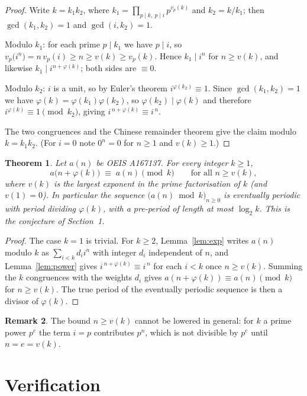 \documentclass[11pt,a4paper]{article}
\theoremstyle{plain}
\newtheorem{theorem}{Theorem}
\theoremstyle{definition}
\newtheorem{remark}[theorem]{Remark}
\begin{document}
\begin{proof}
Write $k=k_1k_2$, where $k_1=\prod_{p\mid k,\ p\mid i}p^{v_p(k)}$ and $k_2=k/k_1$; then
$\gcd(k_1,k_2)=1$ and $\gcd(i,k_2)=1$.

Modulo $k_1$: for each prime $p\mid k_1$ we have $p\mid i$, so
$v_p\bigl(i^{n}\bigr)=n\,v_p(i)\ge n\ge v(k)\ge v_p(k)$. Hence $k_1\mid i^{n}$ for
$n\ge v(k)$, and likewise $k_1\mid i^{n+\varphi(k)}$; both sides are $\equiv 0$.

Modulo $k_2$: $i$ is a unit, so by Euler's theorem $i^{\varphi(k_2)}\equiv 1$. Since
$\gcd(k_1,k_2)=1$ we have $\varphi(k)=\varphi(k_1)\varphi(k_2)$, so
$\varphi(k_2)\mid\varphi(k)$ and therefore $i^{\varphi(k)}\equiv 1 \pmod{k_2}$, giving
$i^{\,n+\varphi(k)}\equiv i^{\,n}$.

The two congruences and the Chinese remainder theorem give the claim modulo $k=k_1k_2$.
(For $i=0$ note $0^{n}=0$ for $n\ge 1$ and $v(k)\ge1$.)
\end{proof}

\begin{theorem}\label{thm:main}
Let $a(n)$ be OEIS A167137. For every integer $k\ge1$,
\[
a\bigl(n+\varphi(k)\bigr)\;\equiv\;a(n)\pmod{k}\qquad\text{for all } n\ge v(k),
\]
where $v(k)$ is the largest exponent in the prime factorisation of $k$ (and $v(1)=0$).
In particular the sequence $\bigl(a(n)\bmod k\bigr)_{n\ge0}$ is eventually periodic with
period dividing $\varphi(k)$, with a pre-period of length at most $\log_2 k$. This is the
conjecture of Section~1.
\end{theorem}

\begin{proof}
The case $k=1$ is trivial. For $k\ge2$, Lemma~\ref{lem:exp} writes $a(n)$ modulo $k$ as
$\sum_{i<k}d_i i^{n}$ with integer $d_i$ independent of $n$, and Lemma~\ref{lem:power}
gives $i^{\,n+\varphi(k)}\equiv i^{\,n}$ for each $i<k$ once $n\ge v(k)$. Summing the
$k$ congruences with the weights $d_i$ gives
$a(n+\varphi(k))\equiv a(n)\pmod k$ for $n\ge v(k)$. The true period of the eventually
periodic sequence is then a divisor of $\varphi(k)$.
\end{proof}

\begin{remark}
The bound $n\ge v(k)$ cannot be lowered in general: for $k$ a prime power $p^{e}$ the
term $i=p$ contributes $p^{n}$, which is not divisible by $p^{e}$ until $n=e=v(k)$.
\end{remark}

\section{Verification}
\end{document}
